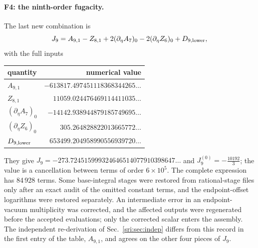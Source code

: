 \paragraph{F4: the ninth-order fugacity.} The last new combination is
\begin{equation}
 J_9=A_{9,1}-Z_{8,1}+2(\partial_\eta A_7)_0-2(\partial_\eta Z_6)_0+D_{9,\rm lower},
\end{equation}
with the full inputs
\begin{center}\small
\begin{tabular}{@{}lr@{}}
\toprule
quantity & numerical value\\
\midrule
$A_{9,1}$ & $-613817.497451118368344265\ldots$\\
$Z_{8,1}$ & $11059.024476469114411035\ldots$\\
$(\partial_\eta A_7)_0$ & $-14142.938944879185749695\ldots$\\
$(\partial_\eta Z_6)_0$ & $305.264828822013665772\ldots$\\
$D_{9,\rm lower}$ & $653499.204958990556939720\ldots$\\
\bottomrule
\end{tabular}
\end{center}
They give $J_9=-273.724515999324646514077910398647\ldots$ and $J_9^{(0)}=-\frac{10192}{3}$; the value is a cancellation
between terms of order $6\times10^5$. The complete expression has 84\,928 terms. Some base-integral stages were
restored from rational-stage files only after an exact audit of the omitted constant terms, and the endpoint-offset
logarithms were restored separately. An intermediate error in an endpoint-vacuum multiplicity was corrected, and the
affected outputs were regenerated before the accepted evaluations; only the corrected scalar enters the assembly. The
independent re-derivation of Sec.~\ref{sri:sec:indep} differs from this record in the first entry of the table,
$A_{9,1}$, and agrees on the other four pieces of $J_9$.


